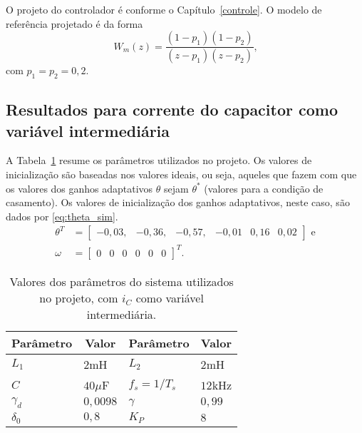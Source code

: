   O projeto do controlador é conforme o Capítulo~\ref{controle}. O modelo de referência projetado é da forma
  \begin{equation}
    W_m(z) = \frac{(1-p_1)(1-p_2)}{(z-p_1)(z-p_2)}\text{,}
    \label{eq:wm_simulacao}
  \end{equation}
  com $p_1 = p_2 = 0,2$.

  \subsection{Resultados para corrente do capacitor como variável intermediária}

	A Tabela~\ref{tab:parametros_projeto} resume os parâmetros utilizados no projeto. Os valores de inicialização são baseadas nos valores ideais, ou seja, aqueles que fazem com que os valores dos ganhos adaptativos $\theta$ sejam $\theta^*$ (valores para a condição de casamento). Os valores de inicialização dos ganhos adaptativos, neste caso, são dados por \ref{eq:theta_sim}.
  \begin{equation}
    \begin{split}
      \theta^T & = \left[ \begin{matrix} -0,03, & -0,36, & -0,57, & -0,01 & 0,16 & 0,02 \end{matrix} \right]\text{ e}\\
      \omega & = {\left[ \begin{matrix} 0 & 0 & 0 & 0 & 0 & 0 \end{matrix} \right]}^T\text{.}
    \end{split}
    \label{eq:theta_sim}
  \end{equation}

  \begin{table}[htb]
    \renewcommand{\arraystretch}{1.35}
    \setlength{\tabcolsep}{1.2mm}
    \caption{Valores dos parâmetros do sistema utilizados no projeto, com $i_C$ como variável intermediária.}
    \label{tab:parametros_projeto}
    \centering
    \begin{tabular}{l l l l}
      \hline
      \multicolumn{1}{c}{Parâmetro} & \multicolumn{1}{c}{Valor} &
      \multicolumn{1}{c}{Parâmetro} & \multicolumn{1}{c}{Valor} \\
      \hline
      $L_1$      & $2$mH    & $L_2$         & $2$mH   \\
      $C$        & $40\mu$F & $f_s = 1/T_s$ & $12$kHz \\
      $\gamma_d$ & $0,0098$ & $\gamma$      & $0,99$  \\
      $\delta_0$ & $0,8$    & $K_P$         & $8$     \\
      \hline
    \end{tabular}
  \end{table}

